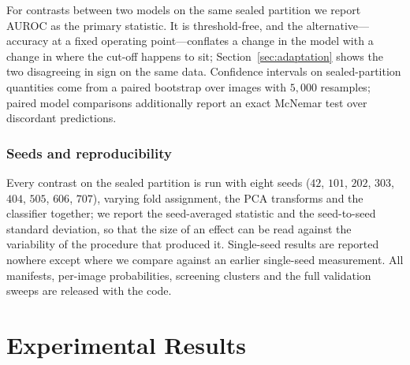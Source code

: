 \documentclass[pdflatex,sn-mathphys-num]{sn-jnl}
\begin{document}
For contrasts between two models on the same sealed partition we report AUROC
as the primary statistic. It is threshold-free, and the alternative---accuracy
at a fixed operating point---conflates a change in the model with a change in
where the cut-off happens to sit; Section~\ref{sec:adaptation} shows the two
disagreeing in sign on the same data. Confidence intervals on sealed-partition
quantities come from a paired bootstrap over images with $5{,}000$ resamples;
paired model comparisons additionally report an exact McNemar test over
discordant predictions.

\subsubsection{Seeds and reproducibility}
Every contrast on the sealed partition is run with eight seeds
($42$, $101$, $202$, $303$, $404$, $505$, $606$, $707$), varying fold
assignment, the PCA transforms and the classifier together; we report the
seed-averaged statistic and the seed-to-seed standard deviation, so that the
size of an effect can be read against the variability of the procedure that
produced it. Single-seed results are reported nowhere except where we compare
against an earlier single-seed measurement. All manifests, per-image
probabilities, screening clusters and the full validation sweeps are released
with the code.


%
%

\section{Experimental Results}
\end{document}
